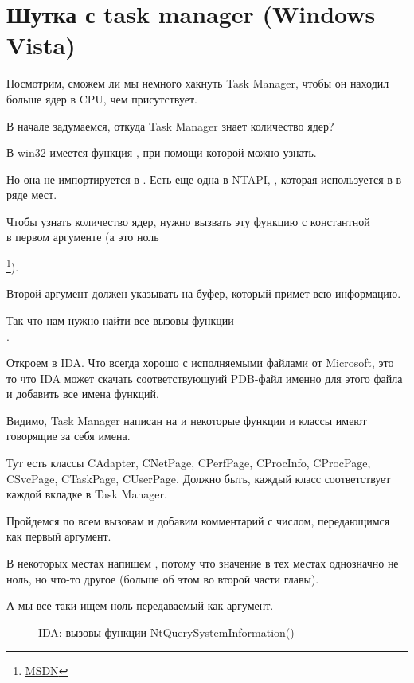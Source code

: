 ﻿\section{Шутка с task manager (Windows Vista)}

Посмотрим, сможем ли мы немного хакнуть Task Manager, чтобы он находил больше ядер в \ac{CPU}, чем присутствует.

В начале задумаемся, откуда Task Manager знает количество ядер?

В win32 имеется функция , при помощи которой можно узнать.

Но она не импортируется в .
Есть еще одна в \gls{NTAPI}, , которая используется в 
 в ряде мест.

Чтобы узнать количество ядер, нужно вызвать эту функцию с константной \\
 в первом аргументе (а это ноль

\footnote{\href{http://go.yurichev.com/17251}{MSDN}}).

Второй аргумент должен указывать на буфер, который примет всю информацию.

Так что нам нужно найти все вызовы функции \\
.

Откроем  в IDA. 
Что всегда хорошо с исполняемыми файлами от Microsoft, это то что IDA может скачать соответствующуий 
\gls{PDB}-файл именно для этого файла и добавить все имена функций.

Видимо, Task Manager написан на \Cpp и некоторые функции и классы имеют говорящие за себя имена.

Тут есть классы CAdapter, CNetPage, CPerfPage, CProcInfo, CProcPage, CSvcPage, 
CTaskPage, CUserPage.
Должно быть, каждый класс соответствует каждой вкладке в Task Manager.

Пройдемся по всем вызовам и добавим комментарий с числом, передающимся как первый аргумент.

В некоторых местах напишем , потому что значение в тех местах однозначно не ноль, 
но что-то другое (больше об этом во второй части главы).%

А мы все-таки ищем ноль передаваемый как аргумент.

\begin{figure}[H]
\centering
{}
\caption{IDA: вызовы функции NtQuerySystemInformation()}
\end{figure}

